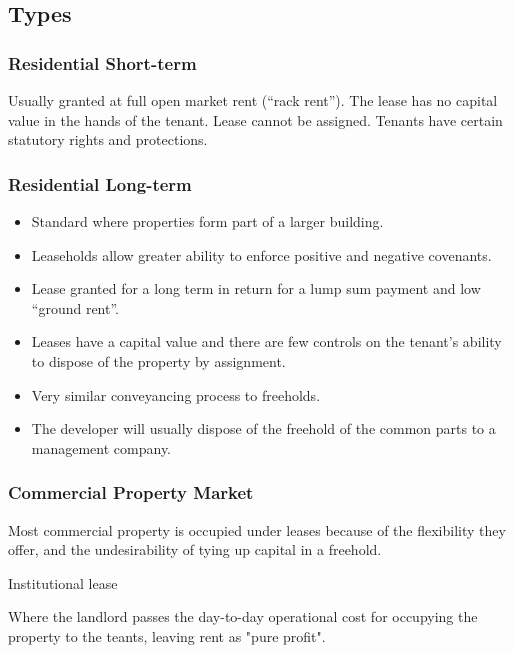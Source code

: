 \documentclass[
]{article}
\providecommand{\tightlist}{%
  \setlength{\itemsep}{0pt}\setlength{\parskip}{0pt}}
\newenvironment{env-ab392b14-a05f-4d9a-80eb-a63d00eb59ea}
{
    \savenotes\tcolorbox[blanker,breakable,left=5pt,borderline west={2pt}{-4pt}{gold}]
}
{
    \endtcolorbox\spewnotes
}
\begin{document}
\hypertarget{types}{%
\subsection{Types}\label{types}}

\hypertarget{residential-short-term}{%
\subsubsection{Residential Short-term}\label{residential-short-term}}

Usually granted at full open market rent (``rack rent''). The lease has
no capital value in the hands of the tenant. Lease cannot be assigned.
Tenants have certain statutory rights and protections.

\hypertarget{residential-long-term}{%
\subsubsection{Residential Long-term}\label{residential-long-term}}

\begin{itemize}
\tightlist
\item
  Standard where properties form part of a larger building.
\item
  Leaseholds allow greater ability to enforce positive and negative
  covenants.
\item
  Lease granted for a long term in return for a lump sum payment and low
  ``ground rent''.
\item
  Leases have a capital value and there are few controls on the tenant's
  ability to dispose of the property by assignment.
\item
  Very similar conveyancing process to freeholds.
\item
  The developer will usually dispose of the freehold of the common parts
  to a management company.
\end{itemize}

\hypertarget{commercial-property-market}{%
\subsubsection{Commercial Property
Market}\label{commercial-property-market}}

Most commercial property is occupied under leases because of the
flexibility they offer, and the undesirability of tying up capital in a
freehold.

\begin{env-ab392b14-a05f-4d9a-80eb-a63d00eb59ea}

Institutional lease

Where the landlord passes the day-to-day operational cost for occupying
the property to the teants, leaving rent as "pure profit".

\end{env-ab392b14-a05f-4d9a-80eb-a63d00eb59ea}
\end{document}
